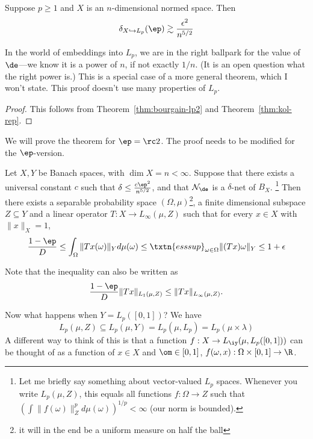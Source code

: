 \begin{thm} 
Suppose $p \geq 1$ and $X$ is an $n$-dimensional normed space. Then 
\[
\delta_{X \hookrightarrow L_p}(\ep) \gtrsim \frac{\epsilon^2}{n^{5/2}}
\]
\end{thm}

In the world of embeddings into $L_p$, we are in the right ballpark for the value of $\de$---we know it is a power of $n$, if not exactly $1/n$. (It is an open question what the right power is.) This is a special case of a more general theorem, which I won't state. This proof doesn't use many properties of $L_p$. 

\begin{proof}
This follows from Theorem~\ref{thm:bourgain-lp2} and Theorem~\ref{thm:kol-rep}.
\end{proof}

We will prove the theorem for $\ep=\rc2$. The proof needs to be modified for the $\ep$-version.

\begin{thm}  
Let $X, Y$ be Banach spaces, with $\dim X = n < \infty$. Suppose that there exists a universal constant $c$ such that $\delta \leq \frac{c\ep^2}{n^{5/2}}$, and that $\cal N_\de$ is a $\delta$-net of $B_X$. \footnote{Let me briefly say something about vector-valued $L_p$ spaces. Whenever you write $L_p(\mu, Z)$, this equals all functions $f: \Omega \to Z$ such that $\left(\int \|f(\omega)\|_Z^p d\mu(\omega)\right)^{1/p} < \infty$ (our norm is bounded).}
Then there exists a separable probability space $(\Omega, \mu)$\footnote{it will in the end be a uniform measure on half the ball}, a finite dimensional subspace $Z \subseteq Y$ and a linear operator $T: X \to L_{\infty}(\mu, Z)$ such that for every $x \in X$ with $\|x\|_X = 1$, 
\[
\frac{1 - \ep}{D} \leq \int_{\Omega} \|Tx(\omega)\|_Y d\mu(\omega) \leq \txtn{esssup}_{\omega \in \Omega} \|(Tx)\omega\|_Y \leq 1 + \epsilon
\]

\end{thm}

Note that the inequality can also be written as  $$\frac{1 - \ep}{D}  \|Tx\|_{L_1(\mu, Z)} \leq \|Tx\|_{L_{\infty}(\mu, Z)}.$$ 

Now what happens when $Y = L_p([0, 1])$? We have
\[
L_p(\mu, Z) \subseteq L_p(\mu, Y) = L_p(\mu, L_p) = L_p(\mu \times \lambda)
\]
A different way to think of this is that a function $f:X\to L_{\iy}(\mu, L_p([0,1]))$ can be thought of as a function of $x\in X$ and $\om\in [0,1]$, $f(\omega, x): \Omega \times [0, 1] \to \R$. 


